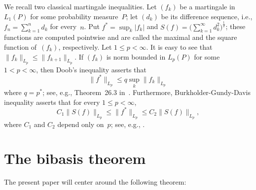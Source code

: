 \documentclass[12pt]{amsart}
\theoremstyle{plain}
\theoremstyle{definition}
\newcommand{\abs}[1]{\lvert#1\rvert}
\newcommand{\norm}[1]{\lVert#1\rVert}
\renewcommand{\le}{\leqslant}
\begin{document}
We recall two classical martingale inequalities. Let $(f_k)$ be a
martingale in $L_1(P)$ for some probability measure~$P$; let $(d_k)$
be its difference sequence, i.e., $f_n=\sum_{k=1}^nd_k$ for
every~$n$. Put $f^*=\sup_k\abs{f_k}$ and
$S(f)=\bigl(\sum_{k=1}^\infty d_k^2\bigr)^\frac12$; these functions
are computed pointwise and are called the maximal and the square
function of~$(f_k)$, respectively. Let $1\le p<\infty$.  It is easy to
see that $\norm{f_k}_{L_p}\le\norm{f_{k+1}}_{L_p}$.  If $(f_k)$ is
norm bounded in $L_p(P)$ for some $1<p<\infty$, then Doob's inequality
asserts that
\begin{equation}\label{Doob}
  \norm{f^*}_{L_p}\le q\sup_k\norm{f_k}_{L_p}
\end{equation}
where $q=p^*$; see, e.g., Theorem~26.3 in~\cite{Jacod:03}.
Furthermore, Burkholder-Gundy-Davis inequality asserts that for every
$1\le p<\infty$,
\begin{equation}\label{BGD}
  C_1\norm{S(f)}_{L_p}\le\norm{f^*}_{L_p}\le C_2\norm{S(f)}_{L_p},
\end{equation}
where $C_1$ and $C_2$ depend only on~$p$; see, e.g., \cite{Davis:70}.



\section{The bibasis theorem}

The present paper will center around the following theorem:
\end{document}
